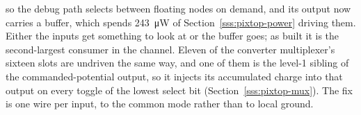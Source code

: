 \begin{itemize}[nosep]
    so the debug path selects between floating nodes on demand, and its
    output now carries a buffer, which spends \SI{243}{\micro\watt} of
    Section~\ref{sss:pixtop-power} driving them. Either the inputs get something
    to look at or the buffer goes; as built it is the second-largest consumer in
    the channel. Eleven of the converter multiplexer's sixteen slots are
    undriven the same way, and one of them is the level-1 sibling of the
    commanded-potential output, so it injects its accumulated charge into that
    output on every toggle of the lowest select bit
    (Section~\ref{sss:pixtop-mux}). The fix is one wire per input, to the
    common mode rather than to local ground.
\end{itemize}

